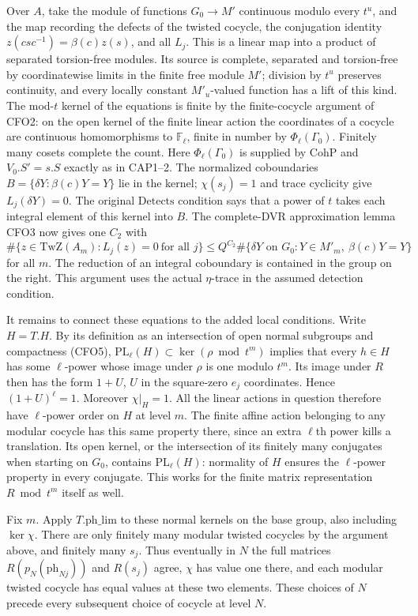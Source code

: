 Over $A$, take the module of functions $G_0\to M'$ continuous
modulo every $t^u$, and the map recording the defects of the
twisted cocycle, the conjugation identity $z(csc^{-1})=\beta(c)z(s)$,
and all $L_j$. This is a linear map into a product of separated
torsion-free modules. Its source is complete, separated and
torsion-free by coordinatewise limits in the finite free module
$M'$; division by $t^u$ preserves continuity, and every locally
constant $M'_u$-valued function has a lift of this kind. The
mod-$t$ kernel of the equations is finite by the finite-cocycle
argument of CFO2: on the open kernel of the finite linear action
the coordinates of a cocycle are continuous homomorphisms to
$\mathbb F_\ell$, finite in number by $\Phi_\ell(\Gamma_0)$.
Finitely many cosets complete the count. Here $\Phi_\ell(\Gamma_0)$
is supplied by $\mathrm{CohP}$ and $V_0.S'=s.S$ exactly as in
CAP1--2. The normalized coboundaries
$B=\{\delta Y:\beta(c)Y=Y\}$ lie in the kernel; $\chi(s_j)=1$
and trace cyclicity give $L_j(\delta Y)=0$.
The original $\mathrm{Detects}$ condition says that a power of
$t$ takes each integral element of this kernel into $B$. The
complete-DVR approximation lemma CFO3 now gives one $C_2$
with
\[
 \#\{z\in\mathrm{TwZ}(A_m): L_j(z)=0\ \text{for all }j\}
       \le Q^{C_2}\#\{\delta Y\text{ on }G_0:
                        Y\in M'_m,\ \beta(c)Y=Y\}
\]
for all $m$. The reduction of an integral coboundary is contained
in the group on the right. This argument uses the actual
$\eta$-trace in the assumed detection condition.

It remains to connect these equations to the added local
conditions. Write $H=T.H$. By its definition as an intersection
of open normal subgroups and compactness (CFO5),
$\mathrm{PL}_\ell(H)\subset\ker(\rho\bmod t^m)$ implies that
every $h\in H$ has some $\ell$-power whose image under $\rho$
is one modulo $t^m$. Its image under $R$ then has the form
$1+U$, $U$ in the square-zero $e_j$ coordinates. Hence
$(1+U)^\ell=1$. Moreover $\chi|_H=1$. All the linear actions
in question therefore have $\ell$-power order on $H$ at
level $m$. The finite affine action belonging to any modular
cocycle has this same property there, since an extra $\ell$th
power kills a translation. Its open kernel, or the intersection
of its finitely many conjugates when starting on $G_0$, contains
$\mathrm{PL}_\ell(H)$: normality of $H$ ensures the $\ell$-power
property in every conjugate. This works for the finite matrix
representation $R\bmod t^m$ itself as well.

Fix $m$. Apply $T.\mathrm{ph\_lim}$ to these normal kernels on
the base group, also including $\ker\chi$. There are only
finitely many modular twisted cocycles by the argument above,
and finitely many $s_j$. Thus eventually in $N$ the full matrices
$R(p_N(\mathrm{ph}_{Nj}))$ and $R(s_j)$ agree, $\chi$ has
value one there, and each modular twisted cocycle has equal
values at these two elements. These choices of $N$ precede
every subsequent choice of cocycle at level $N$.

